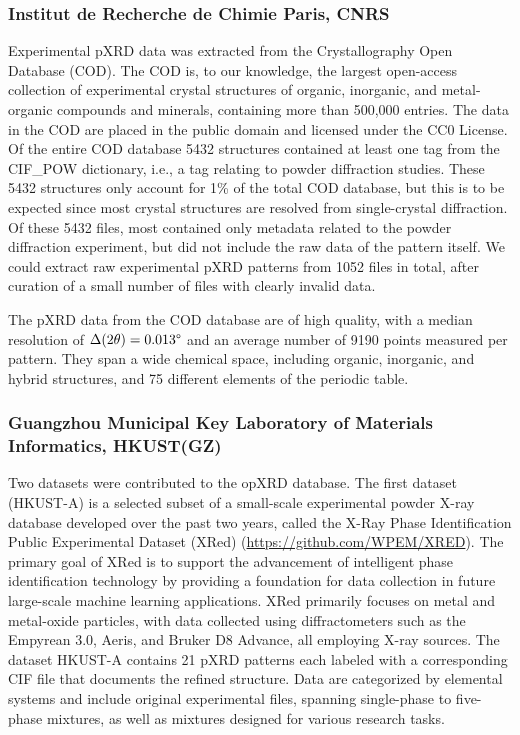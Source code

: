 \subsubsection*{Institut de Recherche de Chimie Paris, CNRS}

Experimental pXRD data was extracted from the Crystallography Open Database (COD)\cite{Grazulis2009, Vaitkus2023}. The COD is, to our knowledge, the largest open-access collection of experimental crystal structures of organic, inorganic, and metal-organic compounds and minerals, containing more than 500,000 entries. The data in the COD are placed in the public domain and licensed under the CC0 License. Of the entire COD database 5432 structures contained at least one tag from the {CIF\_POW} dictionary, i.e., a tag relating to powder diffraction studies. These 5432 structures only account for 1\% of the total COD database, but this is to be expected since most crystal structures are resolved from single-crystal diffraction. Of these 5432 files, most contained only metadata related to the powder diffraction experiment, but did not include the raw data of the pattern itself. We could extract raw experimental pXRD patterns from 1052 files in total, after curation of a small number of files with clearly invalid data.

The pXRD data from the COD database are of high quality, with a median resolution of $\Delta(2\theta) = 0.013\degree$ and an average number of 9190 points measured per pattern. They span a wide chemical space, including organic, inorganic, and hybrid structures, and 75 different elements of the periodic table.

\subsubsection*{Guangzhou Municipal Key Laboratory of Materials Informatics, HKUST(GZ)}

Two datasets were contributed to the opXRD database. The first dataset (HKUST-A) is a selected subset of a small-scale experimental powder X-ray database developed over the past two years, called the X-Ray Phase Identification Public Experimental Dataset (XRed) (\url{https://github.com/WPEM/XRED}). The primary goal of XRed is to support the advancement of intelligent phase identification technology by providing a foundation for data collection in future large-scale machine learning applications. XRed primarily focuses on metal and metal-oxide particles, with data collected using diffractometers such as the Empyrean 3.0, Aeris, and Bruker D8 Advance, all employing  X-ray sources. The dataset HKUST-A contains 21 pXRD patterns each labeled with a corresponding CIF file that documents the refined structure. Data are categorized by elemental systems and include original experimental files, spanning single-phase to five-phase mixtures, as well as mixtures designed for various research tasks.

